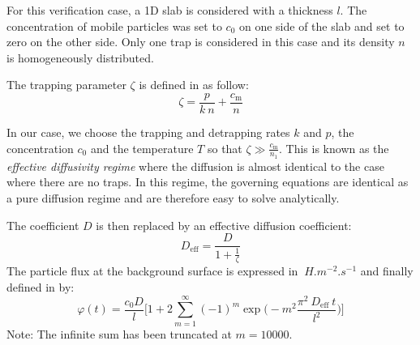 
For this verification case, a 1D slab is considered with a thickness $l$.
The concentration of mobile particles was set to $c_0$ on one side of the slab and set to zero on the other side.
Only one trap is considered in this case and its density $n$ is homogeneously distributed.

The trapping parameter $\zeta$ is defined in  as follow:
\begin{equation}
    \zeta = \frac{p}{k \: n} + \frac{c_\mathrm{m}}{n}
\end{equation}

In our case, we choose the trapping and detrapping rates $k$ and $p$, the concentration $c_0$ and the temperature $T$ so that $\zeta \gg \frac{c_\mathrm{m}}{n_1}$.
This is known as the \textit{effective diffusivity regime} where the diffusion is almost identical to the case where there are no traps.
In this regime, the governing equations are identical as a pure diffusion regime and are therefore easy to solve analytically.

The coefficient $D$ is then replaced by an effective diffusion coefficient:
\begin{equation}
    D_\mathrm{eff} = \frac{D}{1+\frac{1}{\zeta}}
\end{equation}
The particle flux at the background surface is expressed in $\SI{}{H.m^{-2}.s^{-1}}$ and finally defined in  by:
\begin{equation}
    \varphi(t) = \frac{c_0 D}{l}\bigg[1+2\sum_{m=1}^{\infty}(-1)^m \exp\bigg(-m^2\frac{\pi^2 \:D_\mathrm{eff} \: t}{l^2}\bigg)\bigg]
\label{eq:flux analytical}
\end{equation}
Note: The infinite sum has been truncated at $m=10000$.

